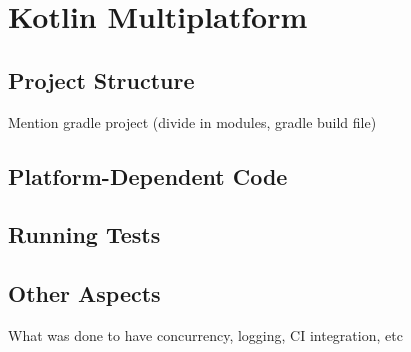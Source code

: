 \chapter{Kotlin Multiplatform}\label{ch:kotlin-multiplatform}


\section{Project Structure}\label{sec:project-structure}
Mention gradle project (divide in modules, gradle build file)


\section{Platform-Dependent Code}\label{sec:platform-dependent-code}


\section{Running Tests}\label{sec:running-tests}


\section{Other Aspects}\label{sec:other-aspects}
What was done to have concurrency, logging, CI integration, etc


